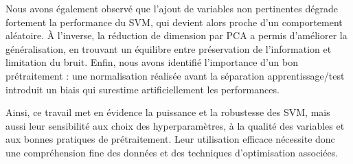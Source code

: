 \documentclass{rapport}
\begin{document}
Nous avons également observé que l’ajout de variables non pertinentes dégrade
fortement la performance du SVM, qui devient alors proche d’un comportement
aléatoire. À l’inverse, la réduction de dimension par PCA a permis d’améliorer
la généralisation, en trouvant un équilibre entre préservation de l’information
et limitation du bruit. Enfin, nous avons identifié l’importance d’un bon
prétraitement : une normalisation réalisée avant la séparation apprentissage/test
introduit un biais qui surestime artificiellement les performances.  

Ainsi, ce travail met en évidence la puissance et la robustesse des SVM, mais
aussi leur sensibilité aux choix des hyperparamètres, à la qualité des variables
et aux bonnes pratiques de prétraitement. Leur utilisation efficace nécessite
donc une compréhension fine des données et des techniques d’optimisation
associées.


\newpage
\end{document}
